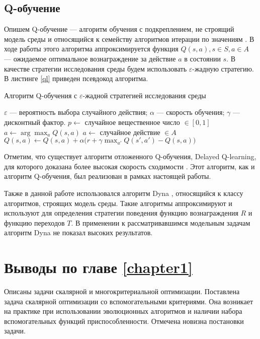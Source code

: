 		\subsection{Q-обучение}
		Опишем Q-обучение --- алгоритм обучения с подкреплением, не строящий модель среды и относящийся к семейству алгоритмов итерации по значениям \cite{ii, systems, sutton}. В ходе работы этого алгоритма аппроксимируется функция $Q(s, a), s \in S, a \in A$ --- ожидаемое оптимальное вознаграждение за действие $a$ в состоянии $s$. В качестве стратегии исследования среды будем использовать $\varepsilon$-жадную стратегию. В листинге \ref{ql} приведен псевдокод алгоритма.
		
		\begin{algorithm}[h!]
		\caption{Алгоритм Q-обучения с $\varepsilon$-жадной стратегией исследования среды}
		\label{ql}
		\begin{algorithmic}[1]
		\REQUIRE  
			$\varepsilon$ --- вероятность выбора случайного действия;
			$\alpha$ --- скорость обучения;
			$\gamma$ --- дисконтный фактор.
			\STATE $p \gets ${ случайное вещественное число} $\in [0, 1]$
				\STATE $a \gets \arg \max_{a}{Q(s,a)}$
			\ELSE 
				\STATE $a \gets$ { случайное действие } $\in A$
			\ENDIF
			\STATE $Q(s,a) \gets Q(s,a) + \alpha(r + \gamma \max_{a'}{Q(s',a') - Q(s, a))}$
		\ENDWHILE
		\end{algorithmic}
		\end{algorithm}
		
		Отметим, что существует алгоритм отложенного Q-обучения, Delayed Q-learning, для которого доказана более высокая скорость сходимости \cite{delayed}. Этот алгоритм, как и алгоритм Q-обучения, был реализован в рамках настоящей работы.
		
		Также в данной работе использовался алгоритм Dyna \cite{sutton}, относящийся к классу алгоритмов, строящих модель среды. Такие алгоритмы аппроксимируют и используют для определения стратегии поведения функцию вознаграждения $R$ и функцию переходов $T$. В применении к рассматривавшимся модельным задачам алгоритм Dyna не показал высоких результатов.

\section{Выводы по главе \protect\ref{chapter1}}
Описаны задачи скалярной и многокритериальной оптимизации. Поставлена задача скалярной оптимизации со вспомогательными критериями. Она возникает на практике при использовании эволюционных алгоритмов и наличии набора вспомогательных функций приспособленности. Отмечена новизна постановки задачи. 

